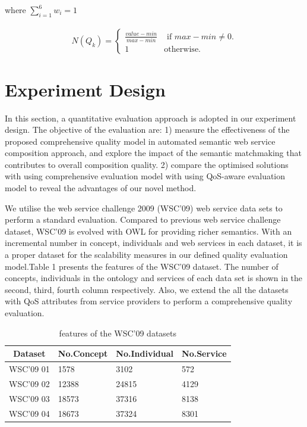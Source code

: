 \documentclass{llncs}
\begin{document}
\noindent where $\sum_{i=1}^{6} w_i = 1$
\\\\
\begin{equation}
\label{equation8}
N(Q_{k}) = 
\begin{cases}
	\frac{value - min}{max - min} & \text{ if }max - min \neq 0.\\
	1 & \mathrm{ otherwise}.
\end{cases}
\end{equation}

\section{Experiment Design}\label{experiment_design}
In this section, a quantitative evaluation approach is adopted in our experiment design. The objective of the evaluation are: 1) measure the effectiveness of the proposed comprehensive quality model in automated semantic web service composition approach, and explore the impact of the semantic matchmaking that contributes to overall composition quality. 2) compare the optimised solutions with using comprehensive evaluation model with using QoS-aware evaluation model to reveal the advantages of our novel method.

We utilise the web service challenge 2009 (WSC’09) web service data sets to perform a standard evaluation. Compared to previous web service challenge dataset, WSC'09 is evolved with OWL for providing richer semantics. With an incremental number in concept, individuals and web services in each dataset, it is a proper dataset for the scalability measures in our defined quality evaluation model.Table 1 presents the features of the WSC’09 dataset. The number of concepts, individuals in the ontology and services of each data set is shown in the second, third, fourth column respectively. Also, we extend the all the datasets with QoS attributes from service providers to perform a comprehensive quality evaluation. 
\begin{table}[]
\centering
\caption{features of the WSC'09 datasets}
\label{wsc09datasetTable}
\begin{tabular}{|l|l|l|l|}
\hline
\multicolumn{1}{|c|}{Dataset} & No.Concept & No.Individual & No.Service \\ \hline
WSC'09 01                     & 1578       &3102           &572      \\ \hline
WSC'09 02                     & 12388      &24815          &4129      \\ \hline
WSC'09 03                     & 18573      &37316          &8138      \\ \hline
WSC'09 04                     & 18673      &37324          &8301      \\ \hline
\end{tabular}
\end{table}
\end{document}
